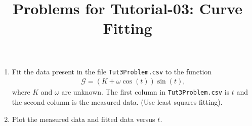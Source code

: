\documentclass[10pt,a4paper]{article}
\begin{document}
\title{Problems for Tutorial-03: Curve Fitting}
\date{}
\maketitle
\begin{enumerate}
\item Fit the data present in the file \verb'Tut3Problem.csv' to the function
\begin{align*}
	\mathcal{G} = \left(K + \omega \cos(t)\right)\sin(t), 
\end{align*}
where $K$ and $\omega$ are unknown. The first column 
in \verb'Tut3Problem.csv' is $t$ and the second column is the measured data. (Use least 
squares fitting).
\item Plot the measured data and fitted data versus $t$.
\end{enumerate}
\end{document}
